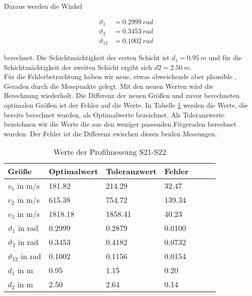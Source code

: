 Daraus werden die Winkel 

\begin{align}
 \vartheta_1 &= \SI{0.2999}{rad} \\
 \vartheta_2 &= \SI{0.3453}{rad} \\
 \vartheta_12 &= \SI{0.1002}{rad}
\end{align}

berechnet.
Die Schichtmächtigkeit der ersten Schicht ist $d_1 =\SI{0.95}{m}$ und für die Schichtmächtigkeit der zweiten Schicht ergibt sich $d2 = \SI{2.50}{m}$.\\



Für die Fehlerbetrachtung haben wir neue, etwas abweichende aber plausible , Geraden durch die Messpunkte gelegt. Mit den neuen Werten wird die Berechnung wiederholt. Die Differenz der neuen Größen und zuvor berechneten optimalen Größen ist der Fehler auf die Werte. In Tabelle \ref{tab:S21-S22} werden die Werte, die bereits berechnet wurden, als Optimalwerte bezeichnet. Als Toleranzwerte bezeichnen wir die Werte die aus den weniger passenden Fitgeraden berechnet wurden. Der Fehler ist die Differenz zwischen diesen beiden Messungen.


\begin{table}[!ht]
\centering
\caption{Werte der Profilmessung S21-S22}
\label{tab:S21-S22}
\begin{tabular}{lllllll}
\toprule
Größe   & Optimalwert   & Toleranzwert   & Fehler \\
\midrule
$v_1$ in m/s & 181.82 & 214.29 & 32.47 \\
$v_2$ in m/s & 615.38 & 754.72 & 139.34 \\
$v_3$ in m/s & 1818.18 & 1858.41 & 40.23 \\
$\vartheta_1$ in rad & 0.2999 & 0.2879 & 0.0100 \\
$\vartheta_2$ in rad & 0.3453 & 0.4182 & 0.0732 \\
$\vartheta_{12}$ in rad & 0.1002 & 0.1156 & 0.0154 \\
$d_1$ in m & 0.95 & 1.15 & 0.20 \\
$d_2$ in m & 2.50 & 2.64 & 0.14 \\

\bottomrule
\end{tabular}
\end{table}


